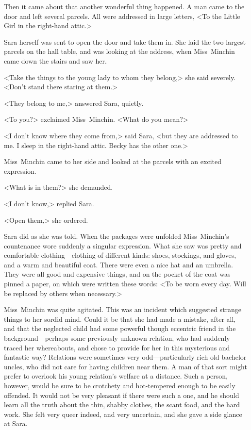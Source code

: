 Then it came about that another wonderful thing happened. A man came to the door and left several parcels. All were addressed in large letters, <To the Little Girl in the right-hand attic.>

Sara herself was sent to open the door and take them in. She laid the two largest parcels on the hall table, and was looking at the address, when Miss~Minchin came down the stairs and saw her.

<Take the things to the young lady to whom they belong,> she said severely. <Don't stand there staring at them.>

<They belong to me,> answered Sara, quietly.

<To you?> exclaimed Miss~Minchin. <What do you mean?>

<I don't know where they come from,> said Sara, <but they are addressed to me. I sleep in the right-hand attic. Becky has the other one.>

Miss~Minchin came to her side and looked at the parcels with an excited expression.

<What is in them?> she demanded.

<I don't know,> replied Sara.

<Open them,> she ordered.

Sara did as she was told. When the packages were unfolded Miss~Minchin's countenance wore suddenly a singular expression. What she saw was pretty and comfortable clothing—clothing of different kinds: shoes, stockings, and gloves, and a warm and beautiful coat. There were even a nice hat and an umbrella. They were all good and expensive things, and on the pocket of the coat was pinned a paper, on which were written these words: <To be worn every day. Will be replaced by others when necessary.>

Miss~Minchin was quite agitated. This was an incident which suggested strange things to her sordid mind. Could it be that she had made a mistake, after all, and that the neglected child had some powerful though eccentric friend in the background—perhaps some previously unknown relation, who had suddenly traced her whereabouts, and chose to provide for her in this mysterious and fantastic way? Relations were sometimes very odd—particularly rich old bachelor uncles, who did not care for having children near them. A man of that sort might prefer to overlook his young relation's welfare at a distance. Such a person, however, would be sure to be crotchety and hot-tempered enough to be easily offended. It would not be very pleasant if there were such a one, and he should learn all the truth about the thin, shabby clothes, the scant food, and the hard work. She felt very queer indeed, and very uncertain, and she gave a side glance at Sara.

